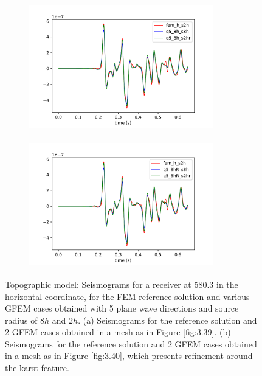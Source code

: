  \begin{figure}[h!]
 		\centering
		\begin{subfigure}{8cm}
				\includegraphics[width=8cm, height=5.5cm]{Thesis_Edith/figures/topo/topo_waves/gfem_topo_tr75.pdf}
			     \caption{}
		\end{subfigure}
        \hspace{0.25cm}	
		\begin{subfigure}{8cm}
				\includegraphics[width=8cm, height=5.5cm]{Thesis_Edith/figures/topo/topo_waves/gfemr_topo_tr75.pdf}
			   \caption{}
		\end{subfigure}
 
	\caption{Topographic model: Seismograms for a receiver at 580.3 in the horizontal coordinate, for the FEM reference solution and various GFEM cases obtained with 5 plane wave directions and source radius of $8h$ and $2h$. (a) Seismograms for the reference solution and 2 GFEM cases obtained in a mesh as in Figure \ref{fig:3.39}. (b) Seismograms for the reference solution and 2 GFEM cases obtained in a mesh as in Figure \ref{fig:3.40}, which presents refinement around the karst feature.}
	\label{fig:3.43}
\end{figure}

